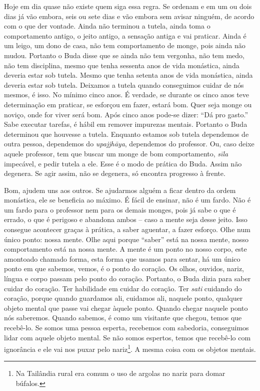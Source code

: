 Hoje em dia quase não existe quem siga essa regra. Se ordenam e em
um ou dois dias já vão embora, seis ou sete dias e vão embora sem
avisar ninguém, de acordo com o que der vontade. Ainda não terminou a
tutela, ainda toma o comportamento antigo, o jeito antigo, a sensação
antiga e vai praticar. Ainda é um leigo, um dono de casa, não tem
comportamento de monge, pois ainda não mudou. Portanto o Buda disse que
se ainda não tem vergonha, não tem medo, não tem disciplina, mesmo que
tenha sessenta anos de vida monástica, ainda deveria estar sob tutela.
Mesmo que tenha setenta anos de vida monástica, ainda deveria estar sob
tutela. Deixamos a tutela quando conseguimos cuidar de nós mesmos, é
isso. No mínimo cinco anos. É verdade, se durante os cinco anos teve
determinação em praticar, se esforçou em fazer, estará bom. Quer seja
monge ou noviço, onde for viver será bom. Após cinco anos pode-se
dizer: “Dá pro gasto.” Sabe executar tarefas, é hábil em remover
impurezas mentais. Portanto o Buda determinou que houvesse a tutela.
Enquanto estamos sob tutela dependemos de outra pessoa, dependemos do
\textit{upajjh\=aya}, dependemos do professor. Ou, caso deixe aquele
professor, tem que buscar um monge de bom comportamento,
\textit{sīla} impecável, e pedir tutela a ele. Esse é o modo de
prática do Buda. Assim não degenera. Se agir assim, não se degenera, só
encontra progresso à frente. 

Bom, ajudem uns aos outros. Se ajudarmos alguém a ficar dentro da
ordem monástica, ele se beneficia ao máximo. É fácil de ensinar, não é
um fardo. Não é um fardo para o professor nem para os demais monges,
pois já sabe o que é errado, o que é perigoso e abandona ambos – caso a
mente seja desse jeito. Isso consegue acontecer graças à prática, a
saber aguentar, a fazer esforço. Olhe num único ponto: nossa mente.
Olhe aqui porque “saber” está na nossa mente, nosso comportamento está
na nossa mente. A mente é um ponto no nosso corpo, este amontoado
chamado forma, esta forma que usamos para sentar, há um único ponto em
que sabemos, vemos, é o ponto do coração. Os olhos, ouvidos, nariz,
língua e corpo passam pelo ponto do coração. Portanto, o Buda dizia
para saber cuidar do coração. Ter habilidade em cuidar do coração. Ter
\textit{sati} cuidando do coração, porque quando guardamos ali,
cuidamos ali, naquele ponto, qualquer objeto mental que passe vai
chegar àquele ponto. Quando chegar naquele ponto nós saberemos. Quando
sabemos, é como um visitante que chegou, temos que recebê-lo. Se somos
uma pessoa esperta, recebemos com sabedoria, conseguimos lidar com
aquele objeto mental. Se não somos espertos, temos que recebê-lo com
ignorância e ele vai nos puxar pelo nariz\footnote{Na Tailândia rural
era comum o uso de argolas no nariz para domar búfalos.}. A mesma coisa
com os objetos mentais. 

